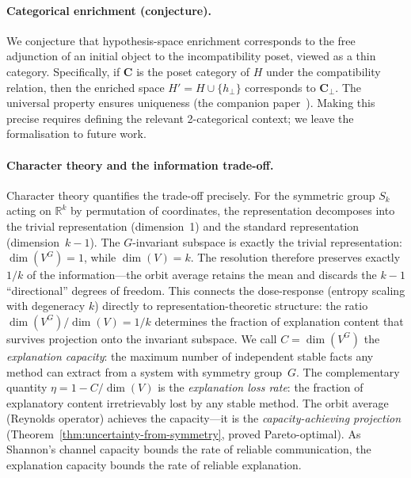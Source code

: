 \documentclass[11pt,a4paper]{article}
\newcommand{\R}{\mathbb{R}}
\begin{document}
\paragraph{Categorical enrichment (conjecture).}
We conjecture that hypothesis-space enrichment corresponds to the free adjunction of an initial object to the incompatibility poset, viewed as a thin category. Specifically, if $\mathbf{C}$ is the poset category of $H$ under the compatibility relation, then the enriched space $H' = H \cup \{h_\bot\}$ corresponds to $\mathbf{C}_\bot$. The universal property ensures uniqueness (the companion paper~\citep{caraker2026ostrowski}). Making this precise requires defining the relevant 2-categorical context; we leave the formalisation to future work.

\paragraph{Character theory and the information trade-off.}
Character theory quantifies the trade-off precisely.  For the symmetric
group $S_k$ acting on $\R^k$ by permutation of coordinates, the
representation decomposes into the trivial representation (dimension~1)
and the standard representation (dimension~$k - 1$).  The $G$-invariant
subspace is exactly the trivial representation: $\dim(V^G) = 1$, while
$\dim(V) = k$.  The resolution therefore preserves exactly $1/k$ of the
information---the orbit average retains the mean and discards the
$k - 1$ ``directional'' degrees of freedom.  This connects the
dose-response (entropy scaling with degeneracy $k$) directly to
representation-theoretic structure: the ratio
$\dim(V^G) / \dim(V) = 1/k$ determines the fraction of explanation
content that survives projection onto the invariant subspace.
We call $C = \dim(V^G)$ the \emph{explanation capacity}: the maximum
number of independent stable facts any method can extract from a system
with symmetry group~$G$.  The complementary quantity $\eta = 1 - C/\dim(V)$
is the \emph{explanation loss rate}: the fraction of explanatory content
irretrievably lost by any stable method.  The orbit average (Reynolds
operator) achieves the capacity---it is the \emph{capacity-achieving
projection} (Theorem~\ref{thm:uncertainty-from-symmetry}, proved
Pareto-optimal).  As Shannon's channel capacity bounds the rate of
reliable communication, the explanation capacity bounds the rate of
reliable explanation.
\end{document}
